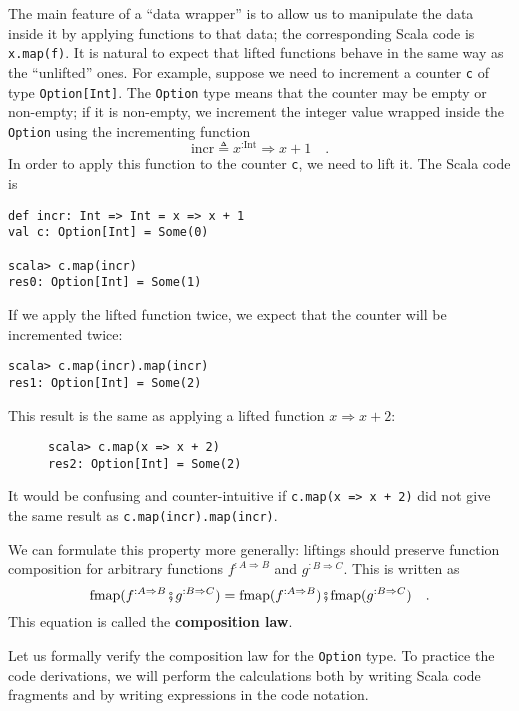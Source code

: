 The main feature of a ``data wrapper'' is to allow us to manipulate
the data inside it by applying functions to that data; the corresponding
Scala code is \lstinline!x.map(f)!. It is natural to expect that
lifted functions behave in the same way as the ``unlifted'' ones.
For example, suppose we need to increment a counter \lstinline!c!
of type \lstinline!Option[Int]!. The \lstinline!Option! type means
that the counter may be empty or non-empty; if it is non-empty, we
increment the integer value wrapped inside the \lstinline!Option!
using the incrementing function
\[
\text{incr}\triangleq x^{:\text{Int}}\Rightarrow x+1\quad.
\]
In order to apply this function to the counter \lstinline!c!, we
need to lift it. The Scala code is
\begin{lstlisting}
def incr: Int => Int = x => x + 1
val c: Option[Int] = Some(0)

scala> c.map(incr)
res0: Option[Int] = Some(1) 
\end{lstlisting}
If we apply the lifted function twice, we expect that the counter
will be incremented twice:
\begin{lstlisting}
scala> c.map(incr).map(incr)
res1: Option[Int] = Some(2)
\end{lstlisting}
This result is the same as applying a lifted function $x\Rightarrow x+2$:

\begin{wrapfigure}{l}{0.3\columnwidth}%
\vspace{-0.8\baselineskip}
\begin{lstlisting}
scala> c.map(x => x + 2)
res2: Option[Int] = Some(2)
\end{lstlisting}
\vspace{-1.2\baselineskip}
\end{wrapfigure}%
It would be confusing and counter-intuitive if \lstinline!c.map(x => x + 2)!
did not give the same result as \lstinline!c.map(incr).map(incr)!. 

We can formulate this property more generally: liftings should preserve
function composition for arbitrary functions $f^{:A\Rightarrow B}$
and $g^{:B\Rightarrow C}$. This is written as
\[
\text{fmap}(f^{:A\Rightarrow B}\bef g^{:B\Rightarrow C})=\text{fmap}(f^{:A\Rightarrow B})\bef\text{fmap}(g^{:B\Rightarrow C})\quad.
\]
This equation is called the \textbf{composition law}.

Let us formally verify the composition law for the \lstinline!Option!
type. To practice the code derivations, we will perform the calculations
both by writing Scala code fragments and by writing expressions in
the code notation.

